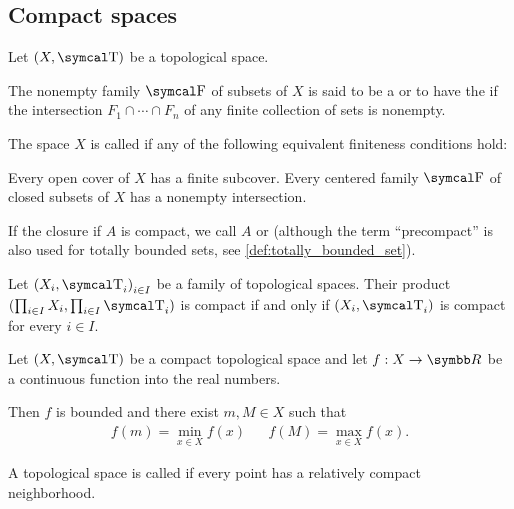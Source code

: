 \subsection{Compact spaces}\label{subsec:compact_spaces}

Let \( (X, \CT) \) be a topological space.

\begin{definition}\label{def:centered_family}\cite[123]{Engelking1989}
  The nonempty family \( \CF \) of subsets of \( X \) is said to be a  or to have the  if the intersection \( F_1 \cap \cdots \cap F_n \) of any finite collection of sets is nonempty.
\end{definition}

\begin{definition}\label{def:compact_space}\cite[123]{Engelking1989}
  The space \( X \) is called  if any of the following equivalent finiteness conditions hold:
  \begin{defenum}
     Every open cover of \( X \) has a finite subcover.
     Every centered family \( \CF \) of closed subsets of \( X \) has a nonempty intersection.
  \end{defenum}
\end{definition}

\begin{remark}\label{remark:precompact_set}
  If the closure if \( A \) is compact, we call \( A \)  or  (although the term \enquote{precompact} is also used for totally bounded sets, see \ref{def:totally_bounded_set}).
\end{remark}

\begin{theorem}\label{thm:tychonoffs_product_theorem}\cite[theorem 3.2.4]{Engelking1989}
  Let \( { (X_i, \CT_i) }_{i \in I} \) be a family of topological spaces. Their product \( (\prod_{i \in I} X_i, \prod_{i \in I} \CT_i) \) is compact if and only if \( (X_i, \CT_i) \) is compact for every \( i \in I \).

\end{theorem}

\begin{theorem}\label{thm:weierstrass_extreme_value_theorem}
  Let \( (X, \CT) \) be a compact topological space and let \( f: X \to \BR \) be a continuous function into the real numbers.

  Then \( f \) is bounded and there exist \( m, M \in X \) such that
  \begin{align*}
    f(m) = \min_{x \in X} f(x)
    &&
    f(M) = \max_{x \in X} f(x).
  \end{align*}
\end{theorem}

\begin{definition}\label{def:locally_compact_space}\cite[148]{Engelking1989}
  A topological space is called  if every point has a relatively compact neighborhood.
\end{definition}
